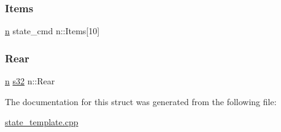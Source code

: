 \mbox{\label{structn_aa86135b44bdda3f39f31e653b9b1d959}} 
\subsubsection{\texorpdfstring{Items}{Items}}
{\footnotesize\ttfamily \hyperlink{structn}{n} state\+\_\+cmd n\+::\+Items\mbox{[}10\mbox{]}}

\mbox{\label{structn_ab3dbe3587b54eb3d74ed1baf3387d15c}} 
\subsubsection{\texorpdfstring{Rear}{Rear}}
{\footnotesize\ttfamily \hyperlink{structn}{n} \hyperlink{ab__common_8h_ae9b1af5c037e57a98884758875d3a7c4}{s32} n\+::\+Rear}



The documentation for this struct was generated from the following file\+:\begin{DoxyCompactItemize}
\item 
\hyperlink{state__template_8cpp}{state\+\_\+template.\+cpp}\end{DoxyCompactItemize}
